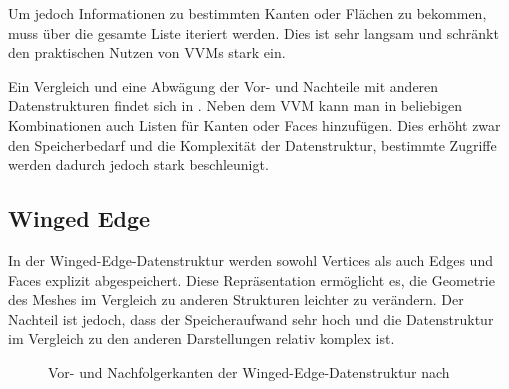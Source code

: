 Um jedoch Informationen zu bestimmten Kanten oder Flächen zu bekommen, muss über die gesamte Liste iteriert werden.
Dies ist sehr langsam und schränkt den praktischen Nutzen von \acp{VVM} stark ein.

Ein Vergleich und eine Abwägung der Vor- und Nachteile mit anderen Datenstrukturen findet sich in \cite[Kap. 11]{smith2006vertex}.
Neben dem \ac{VVM} kann man in beliebigen Kombinationen auch Listen für Kanten oder Faces hinzufügen.
Dies erhöht zwar den Speicherbedarf und die Komplexität der Datenstruktur, bestimmte Zugriffe werden dadurch jedoch stark beschleunigt.


\subsection{Winged Edge}
\label{subsec:winged-edge}

In der Winged-Edge-Datenstruktur \cite{baumgart1975polyhedron} werden sowohl Vertices als auch Edges und Faces explizit abgespeichert.
Diese Repräsentation ermöglicht es, die Geometrie des Meshes im Vergleich zu anderen Strukturen leichter zu verändern.
Der Nachteil ist jedoch, dass der Speicheraufwand sehr hoch und die Datenstruktur im Vergleich zu den anderen Darstellungen relativ komplex ist.

\begin{figure}[H]
\centering
{}
\caption{Vor- und Nachfolgerkanten der Winged-Edge-Datenstruktur nach \cite[591]{baumgart1975polyhedron}}
\label{fig:winged-edge-edges}
\end{figure}


